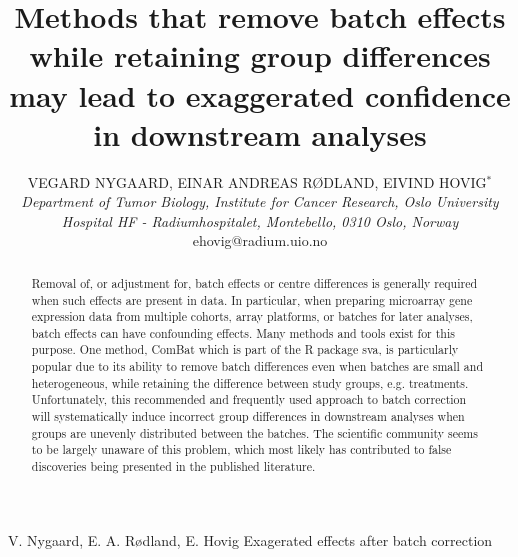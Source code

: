 \documentclass{bio}
\begin{document}
\title{Methods that remove batch effects while retaining group differences may lead
to exaggerated confidence in downstream analyses
}

\author{VEGARD NYGAARD, EINAR ANDREAS RØDLAND, EIVIND HOVIG$^\ast$\\[4pt]
\textit{Department of Tumor Biology,
Institute for Cancer Research,
Oslo University Hospital HF - Radiumhospitalet,
Montebello,
0310 Oslo,
Norway}
\\[2pt]
{ehovig@radium.uio.no}}

\markboth%
{V. Nygaard, E. A. Rødland, E. Hovig}
{Exagerated effects after batch correction}

\maketitle


\begin{abstract}
{Removal of, or adjustment for, batch effects or centre differences is generally required when such effects are present in data. In particular, when preparing microarray gene expression data from multiple cohorts, array platforms, or batches for later analyses, batch effects can have confounding effects. Many methods and tools exist for this purpose. One method, ComBat which is part of the R package sva, is particularly popular due to its ability to remove batch differences even when batches are small and heterogeneous, while retaining the difference between study groups, e.g. treatments. Unfortunately, this recommended and frequently used approach to batch correction will systematically induce incorrect group differences in downstream analyses when groups are unevenly distributed between the batches. The scientific community seems to be largely unaware of this problem, which most likely has contributed to false discoveries being presented in the published literature.
}
\end{abstract}


%
\newcommand\NB[1]{{\color{red}#1}}
\newcommand\NOTE[1]{{\color{red}[#1]}}
\newcommand\CITE[1]{{\color{magenta}[#1]}}
\end{document}

